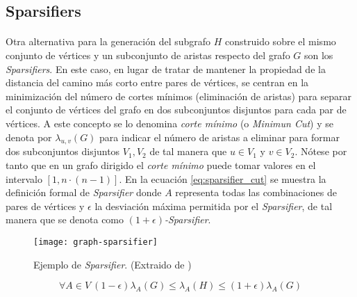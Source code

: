 \documentclass{subfiles}
\begin{document}
      \subsection{Sparsifiers}
      \label{sec:sparsifiers}

        \paragraph{}
        Otra alternativa para la generación del subgrafo $H$ construido sobre el mismo conjunto de vértices y un subconjunto de aristas respecto del grafo $G$ son los \emph{Sparsifiers}. En este caso, en lugar de tratar de mantener la propiedad de la distancia del camino más corto entre pares de vértices, se centran en la minimización del número de cortes mínimos (eliminación de aristas) para separar el conjunto de vértices del grafo en dos subconjuntos disjuntos para cada par de vértices. A este concepto se lo denomina \emph{corte mínimo} (o \emph{Minimun Cut}) y se denota por $\lambda_{u,v}(G)$ para indicar el número de aristas a eliminar para formar dos subconjuntos disjuntos $V_{1}, V_{2}$ de tal manera que $u\in V_{1}$ y $v \in V_{2}$. Nótese por tanto que en un grafo dirigido el \emph{corte mínimo} puede tomar valores en el intervalo $[1, n\cdot(n-1)]$.  En la ecuación \eqref{eq:sparsifier_cut} se muestra la definición formal de \emph{Sparsifier} donde $A$ representa todas las combinaciones de pares de vértices y $\epsilon$ la desviación máxima permitida por el \emph{Sparsifier}, de tal manera que se denota como \emph{$(1 +\epsilon)$-Sparsifier}.

        \begin{figure}
          \centering
          \texttt{[image: graph-sparsifier]}
          \caption{Ejemplo de \emph{Sparsifier}. (Extraido de \cite{harvey2011randomized})}
          \label{img:graph_community_structure}
        \end{figure}

        \begin{equation}
        \label{eq:sparsifier_cut}
          \forall A \in V \  (1-\epsilon)\lambda_A(G)\leq\lambda_A(H)\leq(1+\epsilon)\lambda_A(G)
        \end{equation}
\end{document}
